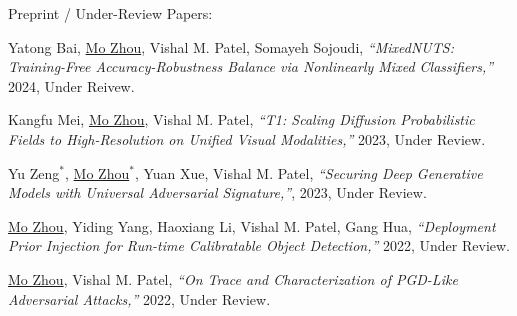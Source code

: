 \documentclass[10pt,margin,line,pifont,palatino,courier]{res}
\begin{document}
\begin{resume}
\begin{enumerate}[noitemsep, leftmargin=*, label={[C0{\arabic*}]}]
\end{enumerate}

	{\sc Preprint / Under-Review Papers:}\\

\begin{enumerate}[noitemsep, leftmargin=*, label={[X0{\arabic*}]}]


\item Yatong Bai, \underline{Mo Zhou}, Vishal M. Patel, Somayeh Sojoudi,
\reversemarginpar{}
\textit{``MixedNUTS: Training-Free Accuracy-Robustness Balance via Nonlinearly Mixed Classifiers,''}
2024, Under Reivew.

\item Kangfu Mei, \underline{Mo Zhou}, Vishal M. Patel,
\reversemarginpar{}
\textit{``T1: Scaling Diffusion Probabilistic Fields to High-Resolution on Unified Visual Modalities,''}
2023, Under Review.

\item Yu Zeng$^*$, \underline{Mo Zhou}$^*$, Yuan Xue, Vishal M. Patel,
\reversemarginpar{}
\textit{``Securing Deep Generative Models with Universal Adversarial Signature,''},
2023, Under Review.

\item \underline{Mo Zhou}, Yiding Yang, Haoxiang Li, Vishal M. Patel, Gang Hua,
\reversemarginpar{}
\textit{``Deployment Prior Injection for Run-time Calibratable Object Detection,''}
2022, Under Review.

\item \underline{Mo Zhou}, Vishal M. Patel,
\reversemarginpar{}
\textit{``On Trace and Characterization of PGD-Like Adversarial Attacks,''}
2022, Under Review.

\end{enumerate}


\end{resume}
\end{document}
